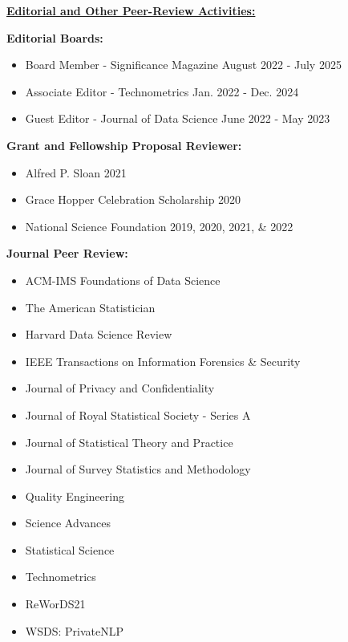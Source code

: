 \professionalspace
\underline{\textbf{\large Editorial and Other Peer-Review Activities:}}\normalsize

\textbf{Editorial Boards:}
\begin{itemize}
    \item Board Member - Significance Magazine \hfill August 2022 - July 2025
    \item Associate Editor - Technometrics \hfill Jan. 2022 - Dec. 2024
    \item Guest Editor - Journal of Data Science \hfill June 2022 - May 2023
\end{itemize}

\vspace{5pt}
\textbf{Grant and Fellowship Proposal Reviewer:}
\begin{itemize}
    \item Alfred P. Sloan \hfill 2021
    \item Grace Hopper Celebration Scholarship \hfill 2020
    \item National Science Foundation \hfill 2019, 2020, 2021, \& 2022
\end{itemize}

\vspace{5pt}
\textbf{Journal Peer Review:}
\vspace{-10pt}
\begin{multicols}{2}
    \begin{itemize}
        \item ACM-IMS Foundations of Data Science
        \item The American Statistician
        \item Harvard Data Science Review
        \item IEEE Transactions on Information Forensics \& Security
        \item Journal of Privacy and Confidentiality
        \item Journal of Royal Statistical Society - Series A
        \item Journal of Statistical Theory and Practice
        \item Journal of Survey Statistics and Methodology
        \item Quality Engineering
        \item Science Advances
        \item Statistical Science
        \item Technometrics
        \item ReWorDS21
        \item WSDS: PrivateNLP
    \end{itemize}
\end{multicols}


